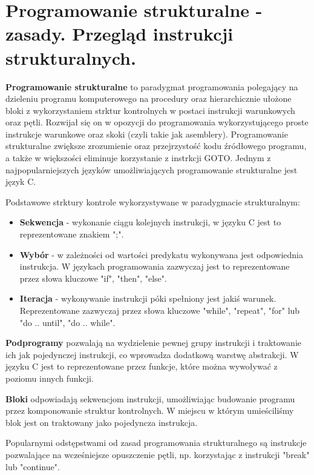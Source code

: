 \documentclass[../main.tex]{subfiles}
\begin{document}
\section{Programowanie strukturalne - zasady. Przegląd instrukcji strukturalnych.}

\textbf{Programowanie strukturalne} to paradygmat programowania polegający na dzieleniu programu komputerowego na procedury oraz hierarchicznie ułożone bloki z wykorzystaniem strktur kontrolnych w postaci instrukcji warunkowych oraz pętli. Rozwijał się on w opozycji do programowania wykorzystującego proste instrukcje warunkowe oraz skoki (czyli takie jak asemblery). Programowanie strukturalne zwiększe zrozumienie oraz przejrzystość kodu źródłowego programu, a także w większości eliminuje korzystanie z instrkcji GOTO. Jednym z najpopularniejszych języków umożliwiających programowanie strukturalne jest język C.

Podstawowe strktury kontrole wykorzystywane w paradygmacie strukturalnym:
\begin{itemize}
    \item \textbf{Sekwencja} - wykonanie ciągu kolejnych instrukcji, w języku C jest to reprezentowane znakiem ";".
    \item \textbf{Wybór} - w zależności od wartości predykatu wykonywana jest odpowiednia instrukcja. W językach programowania zazwyczaj jest to reprezentowane przez słowa kluczowe "if", "then", "else".
    \item \textbf{Iteracja} - wykonywanie instrukcji póki spełniony jest jakiś warunek. Reprezentowane zazwyczaj przez słowa kluczowe "while", "repeat", "for" lub "do .. until", "do .. while".
\end{itemize}

\textbf{Podprogramy} pozwalają na wydzielenie pewnej grupy instrukcji i traktowanie ich jak pojedynczej instrukcji, co wprowadza dodatkową warstwę abstrakcji. W języku C jest to reprezentowane przez funkcje, które można wywoływać z poziomu innych funkcji.

\textbf{Bloki} odpowiadają sekwencjom instrukcji, umożliwiając budowanie programu przez komponowanie struktur kontrolnych. W miejscu w którym umieściliśmy blok jest on traktowany jako pojedyncza instrukcja.

Popularnymi odstępstwami od zasad programowania strukturalnego są instrukcje pozwalające na wcześniejsze opuszczenie pętli, np. korzystając z instrukcji "break" lub "continue".
\end{document}
